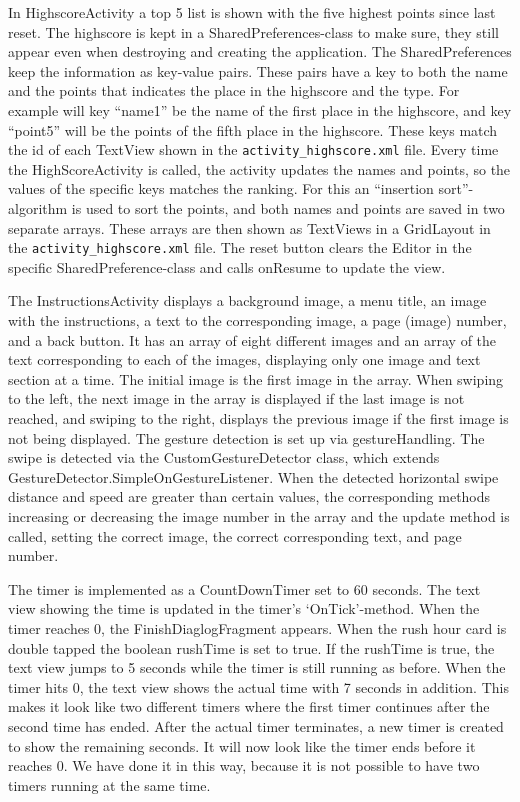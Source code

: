 In HighscoreActivity a top 5 list is shown with the five highest points since last reset. The highscore is kept in a SharedPreferences-class to make sure, they still appear even when destroying and creating the application. The SharedPreferences keep the information as key-value pairs. These pairs have a key to both the name and the points that indicates the place in the highscore and the type. For example will key “name1” be the name of the first place in the highscore, and key “point5” will be the points of the fifth place in the highscore. These keys match the id of each TextView shown in the \verb|activity_highscore.xml| file. Every time the HighScoreActivity is called, the activity updates the names and points, so the values of the specific keys matches the ranking. For this an “insertion sort”-algorithm is used to sort the points, and both names and points are saved in two separate arrays. These arrays are then shown as TextViews in a GridLayout in the \verb|activity_highscore.xml| file.
The reset button clears the Editor in the specific SharedPreference-class and calls onResume to update the view.  \newline

The InstructionsActivity displays a background image, a menu title, an image with the instructions, a text to the corresponding image, a page (image) number, and a back button. It has an array of eight different images and an array of the text corresponding to each of the images, displaying only one image and text section at a time. The initial image is the first image in the array. When swiping to the left, the next image in the array is displayed if the last image is not reached, and swiping to the right, displays the previous image if the first image is not being displayed. The gesture detection is set up via gestureHandling. The swipe is detected via the CustomGestureDetector class, which extends GestureDetector.SimpleOnGestureListener. When the detected horizontal swipe distance and speed are greater than certain values, the corresponding methods increasing or decreasing the image number in the array and the update method is called, setting the correct image, the correct corresponding text, and page number. \newline

The timer is implemented as a CountDownTimer set to 60 seconds. The text view showing the time is updated in the timer’s ‘OnTick’-method.  When the timer reaches 0, the FinishDiaglogFragment appears. When the rush hour card is double tapped the boolean rushTime is set to true. If the rushTime is true, the text view jumps to 5 seconds while the timer is still running as before. When the timer hits 0, the text view shows the actual time with 7 seconds in addition. This makes it look like two different timers where the first timer continues after the second time has ended. After the actual timer terminates, a new timer is created to show the remaining seconds. It will now look like the timer ends before it reaches 0. We have done it in this way, because it is not possible to have two timers running at the same time. 


